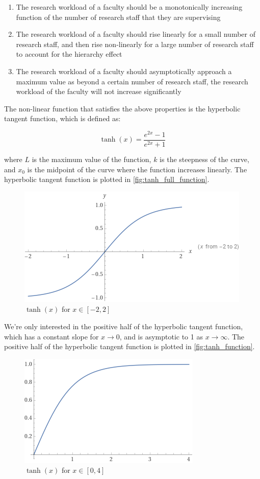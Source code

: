 \begin{enumerate}

  \item The research workload of a faculty should be a monotonically increasing function of the number of research staff that they are supervising
  \item The research workload of a faculty should rise linearly for a small number of research staff, and then rise non-linearly for a large number of research staff to account for the hierarchy effect
  \item The research workload of a faculty should asymptotically approach a maximum value as beyond a certain number of research staff, the research workload of the faculty will not increase significantly

\end{enumerate}

The non-linear function that satisfies the above properties is the hyperbolic tangent function, which is defined as:

\begin{equation*}
  \tanh(x) = \frac{e^{2x} - 1}{e^{2x} + 1}
\end{equation*}

where $L$ is the maximum value of the function, $k$ is the steepness of the curve, and $x_0$ is the midpoint of the curve where the function increases linearly. The hyperbolic tangent function is plotted in \autoref{fig:tanh_full_function}.

\begin{figure}[htpb]
  \centering
  \includegraphics[width=0.5\linewidth]{images/tanh_fullplot.png}
  \caption{\(\tanh(x)\) for \(x \in [-2, 2]\)}
  \label{fig:tanh_full_function}
\end{figure}

We're only interested in the positive half of the hyperbolic tangent function, which has a constant slope for $x \to 0$, and is asymptotic to 1 as $x \to \infty$. The positive half of the hyperbolic tangent function is plotted in \autoref{fig:tanh_function}.

\begin{figure}[htpb]
  \centering
  \includegraphics[width=0.5\linewidth]{images/tanh_plot.png}
  \caption{\(\tanh(x)\) for \(x \in [0, 4]\)}
  \label{fig:tanh_function}
\end{figure}


